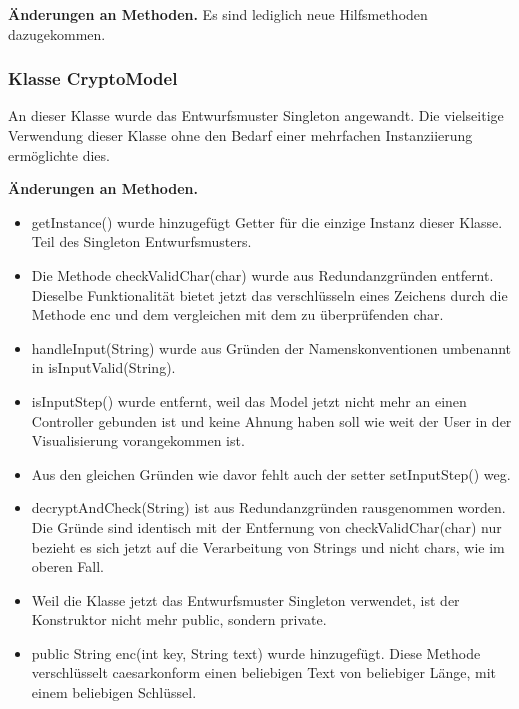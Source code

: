 \documentclass{article}
\begin{document}
          \textbf{Änderungen an Methoden.}\newline
           Es sind lediglich neue Hilfsmethoden dazugekommen.
	\subsubsection{Klasse CryptoModel}
	 An dieser Klasse wurde das Entwurfsmuster Singleton angewandt. Die vielseitige Verwendung dieser Klasse 
	 ohne den Bedarf einer mehrfachen Instanziierung ermöglichte dies.\newline 
	 
	  \textbf{Änderungen an Methoden.}\newline
            \begin{itemize}
             \item getInstance() wurde hinzugefügt\newline
                   Getter für die einzige Instanz dieser Klasse. Teil des Singleton Entwurfsmusters.
             \item Die Methode checkValidChar(char) wurde aus Redundanzgründen entfernt. 
                   Dieselbe Funktionalität bietet jetzt das verschlüsseln eines Zeichens
                   durch die Methode enc und dem vergleichen mit dem zu überprüfenden char.
             \item handleInput(String) wurde aus Gründen der Namenskonventionen umbenannt 
                   in isInputValid(String). 
             \item isInputStep() wurde entfernt, weil das Model jetzt nicht mehr an einen Controller gebunden ist
                   und keine Ahnung haben soll wie weit der User in der Visualisierung vorangekommen ist.
             \item Aus den gleichen Gründen wie davor fehlt auch der setter setInputStep() weg.
             \item decryptAndCheck(String) ist aus Redundanzgründen rausgenommen worden. Die Gründe sind identisch
                   mit der Entfernung von checkValidChar(char) nur bezieht es sich jetzt auf die Verarbeitung von
                   Strings und nicht chars, wie im oberen Fall.
             \item Weil die Klasse jetzt das Entwurfsmuster Singleton verwendet, ist der Konstruktor nicht mehr public,
                   sondern private.
             \item public String enc(int key, String text) wurde hinzugefügt.\newline
                   Diese Methode verschlüsselt caesarkonform einen beliebigen Text von beliebiger Länge, mit einem beliebigen Schlüssel.

\end{itemize}
\end{document}
